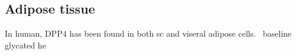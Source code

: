 \subsection{Adipose tissue}
In human, DPP4 has been found in both sc and viseral adipose cells.~\cite{Lamers2011} baseline glycated he 